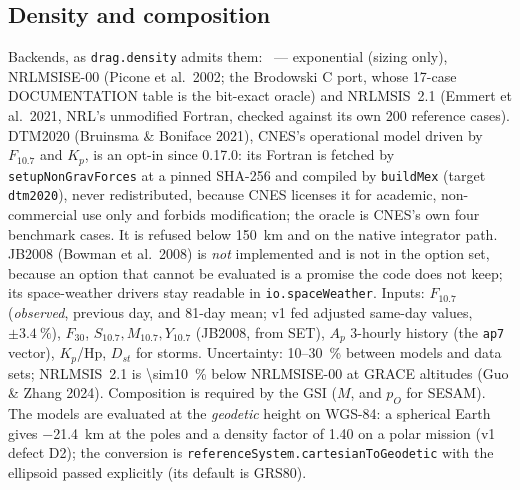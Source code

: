 \subsection{Density and composition}\label{sec:density}
Backends, as \texttt{drag.density} admits them: \ngfoptdragdensity\ --- exponential (sizing only), NRLMSISE-00 (Picone et al.\ 2002; the Brodowski C port, whose 17-case DOCUMENTATION table is the bit-exact oracle) and NRLMSIS~2.1 (Emmert et al.\ 2021, NRL's unmodified Fortran, checked against its own 200 reference cases). DTM2020 (Bruinsma \& Boniface 2021), CNES's operational model driven by $F_{10.7}$ and $K_p$, is an opt-in since 0.17.0: its Fortran is fetched by \texttt{setupNonGravForces} at a pinned SHA-256 and compiled by \texttt{buildMex} (target \texttt{dtm2020}), never redistributed, because CNES licenses it for academic, non-commercial use only and forbids modification; the oracle is CNES's own four benchmark cases. It is refused below \SI{150}{\kilo\metre} and on the native integrator path. JB2008 (Bowman et al.\ 2008) is \emph{not} implemented and is not in the option set, because an option that cannot be evaluated is a promise the code does not keep; its space-weather drivers stay readable in \texttt{io.spaceWeather}. Inputs: $F_{10.7}$ (\emph{observed}, previous day, and 81-day mean; v1 fed adjusted same-day values, $\pm\SI{3.4}{\percent}$), $F_{30}$, $S_{10.7}, M_{10.7}, Y_{10.7}$ (JB2008, from SET), $A_p$ 3-hourly history (the \texttt{ap7} vector), $K_p$/Hp, $D_{st}$ for storms. Uncertainty: \SI{10}{}--\SI{30}{\percent} between models and data sets; NRLMSIS~2.1 is \SI{\sim10}{\percent} below NRLMSISE-00 at GRACE altitudes (Guo \& Zhang 2024). Composition is required by the GSI ($M$, and $p_O$ for SESAM). The models are evaluated at the \emph{geodetic} height on WGS-84: a spherical Earth gives \SI{-21.4}{\kilo\metre} at the poles and a density factor of 1.40 on a polar mission (v1 defect D2); the conversion is \texttt{referenceSystem.cartesianToGeodetic} with the ellipsoid passed explicitly (its default is GRS80).

